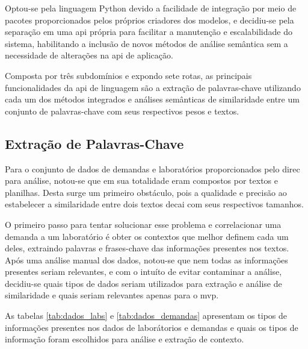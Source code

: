 Optou-se pela linguagem Python devido a facilidade de integração por meio de pacotes proporcionados pelos próprios criadores dos modelos, e decidiu-se pela separação em uma \gls{api} própria para facilitar a manutenção e escalabilidade do sistema, habilitando a inclusão de novos métodos de análise semântica sem a necessidade de alterações na \gls{api} de aplicação.

Composta por três subdomínios e expondo sete rotas, as principais funcionalidades da \gls{api} de linguagem são a extração de palavras-chave utilizando cada um dos métodos integrados e análises semânticas de similaridade entre um conjunto de palavras-chave com seus respectivos pesos e textos.

\subsection{Extração de Palavras-Chave}\label{subsec:keyword_extraction}

Para o conjunto de dados de demandas e laboratórios proporcionados pelo \gls{direc} para análise, notou-se que em sua totalidade eram compostos por textos e planilhas. Desta surge um primeiro obstáculo, pois a qualidade e precisão ao estabelecer a similaridade entre dois textos decai com seus respectivos tamanhos.

O primeiro passo para tentar solucionar esse problema e correlacionar uma demanda a um laboratório é obter os contextos que melhor definem cada um deles, extraindo palavras e frases-chave das informações presentes nos textos. Após uma análise manual dos dados, notou-se que nem todas as informações presentes seriam relevantes, e com o intuíto de evitar contaminar a análise, decidiu-se quais tipos de dados seriam utilizados para extração e análise de similaridade e quais seriam relevantes apenas para o \gls{mvp}.

As tabelas \autoref{tab:dados_labs} e \autoref{tab:dados_demandas} apresentam os tipos de informações presentes nos dados de laborátorios e demandas e quais os tipos de informação foram escolhidos para análise e extração de contexto.

